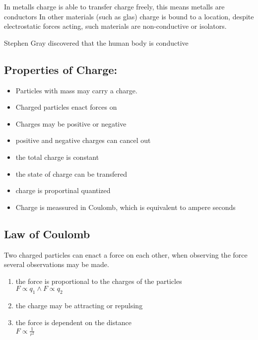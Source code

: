 In metalls charge is able to transfer charge freely,
    this means metalls are conductors
In other materials (such as glas) charge is bound to a location,
    despite electrostatic forces acting,
    such materials are non-conductive or isolators.

\begin{note}
Stephen Gray discovered that the human body is conductive
\end{note}

\subsection{Properties of Charge:}
\begin{itemize}
    \item Particles with mass may carry a charge.

    \item Charged particles enact forces on 

    \item Charges may be positive or negative
    \item positive and negative charges can cancel out
    \item the total charge is constant
    \item the state of charge can be transfered
    \item charge is proportinal quantized
    \item Charge is meassured in Coulomb,
        which is equivalent to ampere seconds
\end{itemize}

\subsection{Law of Coulomb}

Two charged particles can enact a force on each other,
    when observing the force several observations may be made.
\begin{enumerate}
    \item the force is proportional to the charges of the particles\\
        $F\propto q_1 \wedge F\propto q_2$

    \item the charge may be attracting or repulsing
    \item the force is dependent on the distance\\
        $F \propto \frac{1}{r^2}$
\end{enumerate}

